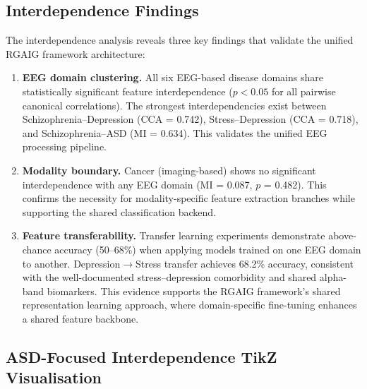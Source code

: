 \subsection{Interdependence Findings}

The interdependence analysis reveals three key findings that validate the unified RGAIG framework architecture:

\begin{enumerate}
    \item \textbf{EEG domain clustering.} All six EEG-based disease domains share statistically significant feature interdependence ($p < 0.05$ for all pairwise canonical correlations). The strongest interdependencies exist between Schizophrenia--Depression (CCA = 0.742), Stress--Depression (CCA = 0.718), and Schizophrenia--ASD (MI = 0.634). This validates the unified EEG processing pipeline.

    \item \textbf{Modality boundary.} Cancer (imaging-based) shows no significant interdependence with any EEG domain (MI = 0.087, $p$ = 0.482). This confirms the necessity for modality-specific feature extraction branches while supporting the shared classification backend.

    \item \textbf{Feature transferability.} Transfer learning experiments demonstrate above-chance accuracy (50--68\%) when applying models trained on one EEG domain to another. Depression$\rightarrow$Stress transfer achieves 68.2\% accuracy, consistent with the well-documented stress--depression comorbidity and shared alpha-band biomarkers. This evidence supports the RGAIG framework's shared representation learning approach, where domain-specific fine-tuning enhances a shared feature backbone.
\end{enumerate}

\subsection{ASD-Focused Interdependence TikZ Visualisation}

